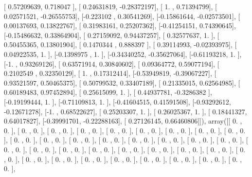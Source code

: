 \documentclass{article}
\begin{document}
       [ 0.57209639,  0.718047  ],
       [ 0.24631819, -0.28372197],
       [ 1.        ,  0.71394799],
       [ 0.02571521, -0.26555753],
       [-0.223102  ,  0.30541269],
       [-0.15861644, -0.02573501],
       [ 0.00137693,  0.13822767],
       [ 0.31983161,  0.25207362],
       [-0.41254151,  0.74390645],
       [-0.15486632,  0.33864904],
       [ 0.27159092,  0.94437257],
       [ 0.32577637,  1.        ],
       [ 0.50455365,  0.13801904],
       [ 0.1470344 ,  0.888397  ],
       [ 0.39114993, -0.02393975],
       [ 0.04922535,  1.        ],
       [-0.1398975 ,  1.        ],
       [-0.34340252, -0.35627064],
       [-0.61193218,  1.        ],
       [-1.        ,  0.93269126],
       [ 0.63571914,  0.30840602],
       [ 0.09364772,  0.59077194],
       [ 0.2102549 ,  0.32350129],
       [ 1.        ,  0.17312414],
       [-0.53949819, -0.39067227],
       [ 0.93521597,  0.50465375],
       [ 0.50799532,  0.33407189],
       [ 0.21335015,  0.62564985],
       [ 0.60189483,  0.97452894],
       [ 0.25615099,  1.        ],
       [ 0.44937781, -0.3286382 ],
       [-0.19199444,  1.        ],
       [-0.71109813,  1.        ],
       [-0.41604515,  0.41591508],
       [-0.93292612, -0.12671278],
       [-1.        ,  0.68522627],
       [ 0.25203307,  1.        ],
       [ 0.26025367,  1.        ],
       [ 0.18441327,  0.64017827],
       [-0.39991701, -0.22288163],
       [ 0.27126145,  0.66460806]]), array([[ 0.        ,  0.        ],
       [ 0.        ,  0.        ],
       [ 0.        ,  0.        ],
       [ 0.        ,  0.        ],
       [ 0.        ,  0.        ],
       [ 0.        ,  0.        ],
       [ 0.        ,  0.        ],
       [ 0.        ,  0.        ],
       [ 0.        ,  0.        ],
       [ 0.        ,  0.        ],
       [ 0.        ,  0.        ],
       [ 0.        ,  0.        ],
       [ 0.        ,  0.        ],
       [ 0.        ,  0.        ],
       [ 0.        ,  0.        ],
       [ 0.        ,  0.        ],
       [ 0.        ,  0.        ],
       [ 0.        ,  0.        ],
       [ 0.        ,  0.        ],
       [ 0.        ,  0.        ],
       [ 0.        ,  0.        ],
       [ 0.        ,  0.        ],
       [ 0.        ,  0.        ],
       [ 0.        ,  0.        ],
       [ 0.        ,  0.        ],
       [ 0.        ,  0.        ],
       [ 0.        ,  0.        ],
       [ 0.        ,  0.        ],
       [ 0.        ,  0.        ],
       [ 0.        ,  0.        ],
       [ 0.        ,  0.        ],
       [ 0.        ,  0.        ],
       [ 0.        ,  0.        ],
       [ 0.        ,  0.        ],
\end{document}
